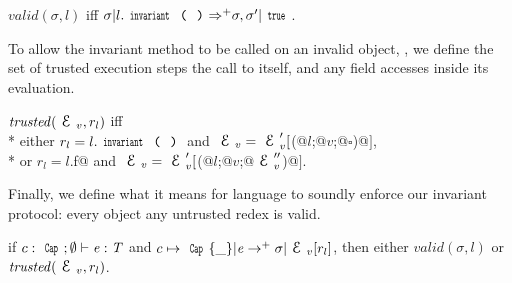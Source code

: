 \indent$\mathit{valid}(\sigma,l)$ iff $\sigma | l.\invariant {\Rightarrow^+} \sigma,\sigma' | \Kw{true}$.\loseSpace
{}

\noindent 
To allow the invariant method to be called on an invalid object, , we define the set of trusted execution steps the call to \Q@invariant@ itself, and any field accesses inside its evaluation. 

\loseSpace
\noindent $\mathit{trusted}(\ctx_v,r_l)$ iff\\*
\indent either
$r_l=l.\invariant$ and
$\ctx_v=\ctx_v'[$\Q@M(@$l$\Q@;@$v$\Q@;@$\square$\Q@)@$]$,\\*
\indent or
$r_l=l$\Q@.f@ and
$\ctx_v=\ctx_v'[$\Q@M(@$l$\Q@;@$v$\Q@;@$\ctx_v''$\Q@)@$]$.
\loseSpace

\noindent Finally, we define what it means for  language to soundly enforce our invariant protocol: every object  any untrusted redex is valid.

\begin{theorem}[Soundness]
if $c:\Kw{Cap};\emptyset\vdash \e: \T$ and
$c\mapsto\Kw{Cap}\{\_\}|\e\rightarrow^+ \sigma|\ctx_v[r_l]$, then
either $\mathit{valid}(\sigma,l)$ or $\mathit{trusted}(\ctx_v,r_l)$.
\end{theorem}



